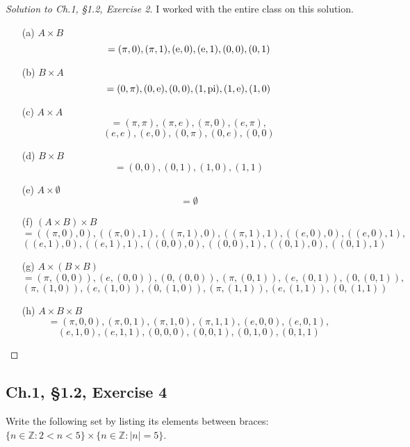 \documentclass[12pt]{amsart}
\numberwithin{equation}{section}
\theoremstyle{definition}
\theoremstyle{remark}
\newcommand{\marg}[1]{\normalsize{{\color{red}\footnote{{\color{blue}#1}}}{\marginpar[\vskip -.3cm {\color{BrickRed}\hfill\thefootnote$\implies$}]{\vskip -.3cm{ \color{BrickRed}$\impliedby$\thefootnote}}}}}
\newcommand{\qc}[1]{\marg{#1}}
\begin{document}
\begin{proof}[Solution to Ch.1, \S 1.2,  Exercise 2] I worked with the entire class on this solution.

\begin{enumerate}

\item[(a)] 
$A \times B$ 
$$ =(\pi, 0), (\pi, 1), (\rm{e}, 0), (\rm{e}, 1), (0, 0), (0, 1) $$

\item[(b)]
$B \times A$
$$ =(0, \pi), (0, \rm{e}), (0, 0), (1, pi), (1, \rm{e}), (1, 0) $$

\item[(c)]
$A \times A$
$$ =(\pi, \pi), (\pi, e), (\pi, 0), (e, \pi),$$
$$ (e, e), (e, 0), (0, \pi), (0, e), (0, 0)$$

\item[(d)]
$B \times B$
$$ =(0, 0), (0, 1), (1, 0), (1, 1) $$

\item[(e)]
$A \times \emptyset$
$$ = \emptyset $$

\item[(f)]
$(A \times B) \times B$
$$ =((\pi, 0), 0), ((\pi, 0), 1), ((\pi, 1), 0), ((\pi, 1), 1), ((e, 0), 0), ((e, 0), 1), $$
$$((e, 1), 0), ((e, 1), 1), ((0, 0), 0), ((0, 0), 1), ((0, 1), 0), ((0, 1), 1)$$

\item[(g)]
$A \times (B \times B)$
$$ =(\pi, (0, 0)), (e, (0, 0)), (0, (0, 0)), (\pi, (0, 1)), (e, (0, 1)), (0, (0, 1)),$$
$$(\pi, (1, 0)), (e, (1, 0)), (0, (1, 0)), (\pi, (1, 1)), (e, (1, 1)), (0, (1, 1))$$

\item[(h)]
$A \times B \times B$
$$ =(\pi, 0, 0), (\pi, 0, 1), (\pi, 1, 0), (\pi, 1, 1), (e, 0, 0), (e, 0, 1), $$
$$(e, 1, 0), (e, 1, 1), (0, 0, 0), (0, 0, 1), (0, 1, 0), (0, 1, 1)$$


\end{enumerate}

\end{proof}




\subsection*{Ch.1, \S 1.2,  Exercise 4}  Write the following set by listing its elements between braces: 
$\{n \in \mathbb Z : 2 < n < 5 \} \times \{n \in \mathbb Z : |n| = 5 \}$.   
\end{document}
